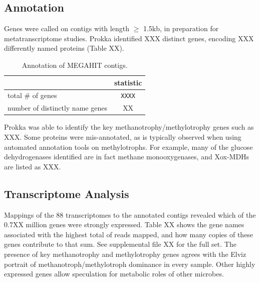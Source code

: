 \subsection{Annotation}

Genes were called on contigs with length $\geq$ 1.5kb, in preparation for metatranscriptome studies.
Prokka identified XXX distinct genes, encoding XXX differently named proteins (Table XX).

\begin{table}[H]
\centering
\begin{singlespace}
\caption[Annotation of MEGAHIT contigs]
	{Annotation of MEGAHIT contigs.}
\begin{tabular}{l | c}
        & statistic  \\
\midrule
	total \# of genes & \texttt{XXXX} \\ %
	number of distinctly name genes & XX \\
\end{tabular}
\label{table:annotation}
\end{singlespace}
\end{table}


Prokka was able to identify the key methanotrophy/methylotrophy genes such as XXX.
Some proteins were mis-annotated, as is typically observed when using automated annotation tools on methylotrophs.
For example, many of the glucose dehydrogenases identified are in fact methane monooxygenases, and Xox-MDHs are listed as XXX.



\subsection{Transcriptome Analysis}

Mappings of the 88 transcriptomes to the annotated contigs revealed which of the 0.7XX million genes were strongly expressed.
Table XX shows the gene names associated with the highest total of reads mapped, and how many copies of these genes contribute to that sum.
See supplemental file XX for the full set.
The presence of key methanotrophy and methylotrophy genes agrees with the Elviz portrait of methanotroph/methylotroph dominance in every sample.
Other highly expressed genes allow speculation for metabolic roles of other microbes.

